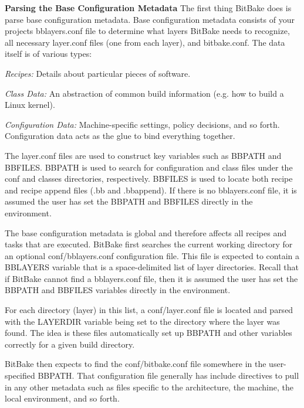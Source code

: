 \begin{DoxyItemize}
\item {\bfseries Parsing the Base Configuration Metadata} The first thing Bit\+Bake does is parse base configuration metadata. Base configuration metadata consists of your project\textquotesingle{}s bblayers.\+conf file to determine what layers Bit\+Bake needs to recognize, all necessary layer.\+conf files (one from each layer), and bitbake.\+conf. The data itself is of various types\+:
\begin{DoxyItemize}
\item {\itshape Recipes\+:} Details about particular pieces of software.
\item {\itshape Class Data\+:} An abstraction of common build information (e.\+g. how to build a Linux kernel).
\item {\itshape Configuration Data\+:} Machine-\/specific settings, policy decisions, and so forth. Configuration data acts as the glue to bind everything together.
\end{DoxyItemize}

The layer.\+conf files are used to construct key variables such as B\+B\+P\+A\+TH and B\+B\+F\+I\+L\+ES. B\+B\+P\+A\+TH is used to search for configuration and class files under the conf and classes directories, respectively. B\+B\+F\+I\+L\+ES is used to locate both recipe and recipe append files (.bb and .bbappend). If there is no bblayers.\+conf file, it is assumed the user has set the B\+B\+P\+A\+TH and B\+B\+F\+I\+L\+ES directly in the environment.

The base configuration metadata is global and therefore affects all recipes and tasks that are executed. Bit\+Bake first searches the current working directory for an optional conf/bblayers.\+conf configuration file. This file is expected to contain a B\+B\+L\+A\+Y\+E\+RS variable that is a space-\/delimited list of \textquotesingle{}layer\textquotesingle{} directories. Recall that if Bit\+Bake cannot find a bblayers.\+conf file, then it is assumed the user has set the B\+B\+P\+A\+TH and B\+B\+F\+I\+L\+ES variables directly in the environment.

For each directory (layer) in this list, a conf/layer.\+conf file is located and parsed with the L\+A\+Y\+E\+R\+D\+IR variable being set to the directory where the layer was found. The idea is these files automatically set up B\+B\+P\+A\+TH and other variables correctly for a given build directory.

Bit\+Bake then expects to find the conf/bitbake.\+conf file somewhere in the user-\/specified B\+B\+P\+A\+TH. That configuration file generally has include directives to pull in any other metadata such as files specific to the architecture, the machine, the local environment, and so forth.


\end{DoxyItemize}
